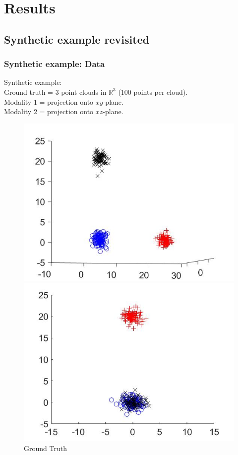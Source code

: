 \documentclass{beamer}
\begin{document}
\section{Results}
\subsection{Synthetic example revisited}
\begin{frame}
  \frametitle{Synthetic example: Data}
  Synthetic example:\\
  Ground truth = 3 point clouds in $\mathbb{R}^3$ (100 points per cloud).\\
  Modality 1 = projection onto $xy$-plane.\\
  Modality 2 = projection onto $xz$-plane.
  \begin{figure}[ht]
    \begin{minipage}[b]{0.3\linewidth}
      \centering
      \includegraphics[width=\textwidth]{./Images/Synthetic/groundTruth.jpg}
      \caption{Ground Truth}
    \end{minipage}
    \begin{minipage}[b]{0.3\linewidth}
      \centering
      \includegraphics[width=\textwidth]{./Images/Synthetic/set1.jpg}

\end{minipage}
\end{figure}
\end{frame}
\end{document}
